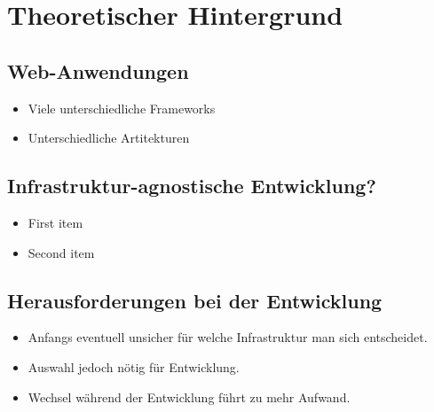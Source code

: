 \chapter{Theoretischer Hintergrund}

\section{Web-Anwendungen}
\label{sec:visual_analytics}

\begin{itemize}
    \item Viele unterschiedliche Frameworks
    \item Unterschiedliche Artitekturen
\end{itemize}

\section{Infrastruktur-agnostische Entwicklung?}

\begin{itemize}
  \item First item
  \item Second item
\end{itemize}

\section{Herausforderungen bei der Entwicklung}
\begin{itemize}
  \item Anfangs eventuell unsicher für welche Infrastruktur man sich entscheidet.
  \item Auswahl jedoch nötig für Entwicklung.
  \item Wechsel während der Entwicklung führt zu mehr Aufwand.
\end{itemize}

\cite{Sammon.1969}\\
\cite{Demartines.1997}\\